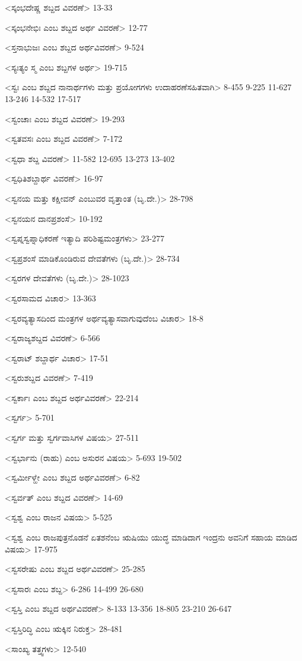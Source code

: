 <ಸ್ಕಂಭದೇಷ್ಣ ಶಬ್ದದ ವಿವರಣೆ>
13-33

<ಸ್ಕಂಭನೇಭಿಃ ಎಂಬ ಶಬ್ದದ ಅರ್ಥ ವಿವರಣೆ>
12-77

<ಸ್ತನಾಭುಜಃ ಎಂಬ ಶಬ್ದದ ಅರ್ಥವಿವರಣೆ>
9-524

<ಸ್ಯಃತ್ಯಂ ಸ್ಮ ಎಂಬ ಶಬ್ದಗಳ ಅರ್ಥ>
19-715

<ಸ್ವಃ ಎಂಬ ಶಬ್ದದ ನಾನಾರ್ಥಗಳು ಮತ್ತು ಪ್ರಯೋಗಗಳು ಉದಾಹರಣೆಸಹಿತವಾಗಿ>
8-455
9-225
11-627
13-246 
14-532
17-517

<ಸ್ವಂಚಾಃ ಎಂಬ ಶಬ್ದದ ವಿವರಣೆ>
19-293

<ಸ್ವತವಸಃ ಎಂಬ ಶಬ್ದದ ವಿವರಣೆ>
7-172

<ಸ್ವಧಾ ಶಬ್ದ ವಿವರಣೆ>
11-582 
12-695
13-273
13-402

<ಸ್ವಧಿತಿಶಬ್ದಾರ್ಥ ವಿವರಣೆ>
16-97

<ಸ್ವನಯ ಮತ್ತು ಕಕ್ಷೀವನ್‍ ಎಂಬುವರ ವೃತ್ತಾಂತ (ಬೃ.ದೇ.)>
28-798

<ಸ್ವನಯನ ದಾನಪ್ರಶಂಸೆ>
10-192

<ಸ್ವಪ್ನಸ್ವಪ್ನಾಧಿಕರಣೆ ಇತ್ಯಾದಿ ಪರಿಶಿಷ್ಟಮಂತ್ರಗಳು>
23-277

<ಸ್ವಪ್ರಶಂಸೆ ಮಾಡಿಕೊಂಡಿರುವ ದೇವತೆಗಳು (ಬೃ.ದೇ.)>
28-734

<ಸ್ವರಗಳ ದೇವತೆಗಳು (ಬೃ.ದೇ.)>
28-1023

<ಸ್ವರಸಾಮದ ವಿಚಾರ>
13-363

<ಸ್ವರವ್ಯತ್ಯಾಸದಿಂದ ಮಂತ್ರಗಳ ಅರ್ಥವ್ಯತ್ಯಾಸವಾಗುವುದೆಂಬ ವಿಚಾರ>
18-8

<ಸ್ವರಾಜ್ಯಶಬ್ದದ ವಿವರಣೆ>
6-566

<ಸ್ವರಾಟ್‍ ಶಬ್ದಾರ್ಥ ವಿಚಾರ>
17-51

<ಸ್ವರುಶಬ್ದದ ವಿವರಣೆ>
7-419

<ಸ್ವರ್ಕಾಃ ಎಂಬ ಶಬ್ದದ ಅರ್ಥವಿವರಣೆ>
22-214

<ಸ್ವರ್ಗ>
5-701

<ಸ್ವರ್ಗ ಮತ್ತು ಸ್ವರ್ಗವಾಸಿಗಳ ವಿಷಯ>
27-511

<ಸ್ವರ್ಭಾನು (ರಾಹು) ಎಂಬ ಅಸುರನ ವಿಷಯ>
5-693
19-502


<ಸ್ವರ್ಮೀಳ್ಹೇ ಎಂಬ ಶಬ್ದದ ಅರ್ಥವಿವರಣೆ>
6-82

<ಸ್ವರ್ವತ್‍ ಎಂಬ ಶಬ್ದದ ವಿವರಣೆ>
14-69

<ಸ್ವಶ್ವ ಎಂಬ ರಾಜನ ವಿಷಯ>
5-525

<ಸ್ವಶ್ವ ಎಂಬ ರಾಜಪುತ್ರನೊಡನೆ ಏತಶನೆಂಬ ಋಷಿಯು ಯುದ್ಧ ಮಾಡಿದಾಗ ಇಂದ್ರನು ಅವನಿಗೆ ಸಹಾಯ ಮಾಡಿದ ವಿಷಯ>
17-975

<ಸ್ವಸರೇಷು ಎಂಬ ಶಬ್ದದ ಅರ್ಥವಿವರಣೆ>
25-285

<ಸ್ವಸಾರಃ ಎಂಬ ಶಬ್ದ>
6-286 
14-499
26-680

<ಸ್ವಸ್ತಿ ಎಂಬ ಶಬ್ದದ ಅರ್ಥವಿವರಣೆ>
8-133
13-356 
18-805 
23-210
26-647


<ಸ್ವಸ್ತಿರಿದ್ಧಿ ಎಂಬ ಋಕ್ಕಿನ ನಿರುಕ್ತ>
28-481

<ಸಾಂಖ್ಯ ತತ್ತ್ವಗಳು>
12-540


